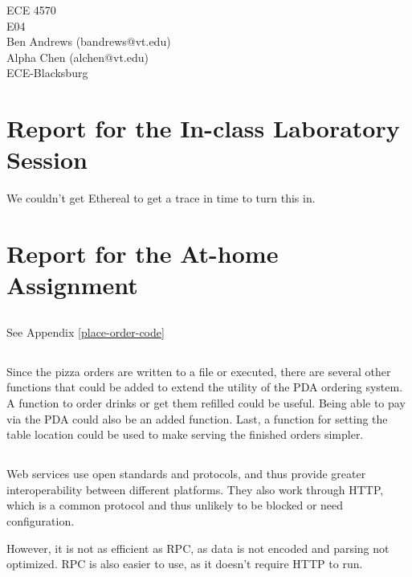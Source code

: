 \documentclass[11pt]{article}
\begin{document}
\begin{flushright}
{ECE 4570}\\{E04}\\{Ben Andrews (bandrews@vt.edu)}\\{Alpha Chen (alchen@vt.edu)}\\{ECE-Blacksburg}\end{flushright}

\section{Report for the In-class Laboratory Session}

We couldn't get Ethereal to get a trace in time to turn this in.

\newpage
\section{Report for the At-home Assignment}

\subsection{}

See Appendix \ref{place-order-code}

\subsection{}

Since the pizza orders are written to a file or executed, there are several other functions that could be added to extend the utility of the PDA ordering system. A function to order drinks or get them refilled could be useful. Being able to pay via the PDA could also be an added function. Last, a function for setting the table location could be used to make serving the finished orders simpler.

\subsection{}

Web services use open standards and protocols, and thus provide greater interoperability between different platforms. They also work through HTTP, which is a common protocol and thus unlikely to be blocked or need configuration.

However, it is not as efficient as RPC, as data is not encoded and parsing not optimized. RPC is also easier to use, as it doesn't require HTTP to run.
\end{document}
